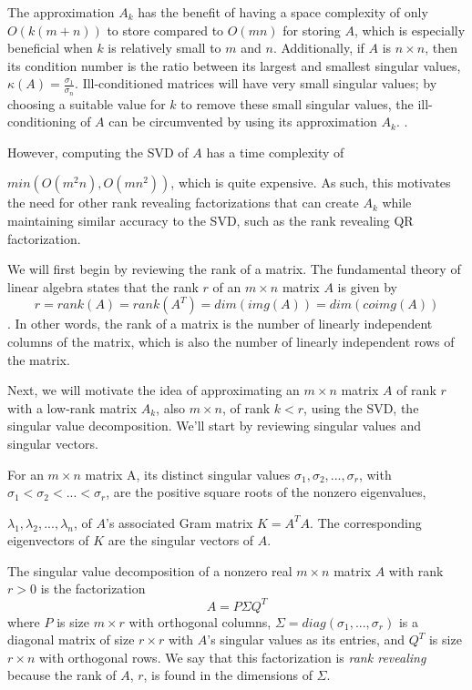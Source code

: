 The approximation $A_k$ has the benefit of having a space complexity of only $O(k(m + n))$ to store compared to $O(mn)$ for storing $A$, which is especially beneficial when $k$ is relatively small to $m$ and $n$. %
Additionally, if $A$ is $n \times n$, then its condition number is the ratio between its largest and smallest singular values, $\kappa(A) = \frac{\sigma_1}{\sigma_n}$. \cite{appliedLinearAlgebra} Ill-conditioned matrices will have very small singular values; by choosing a suitable value for $k$ to remove these small singular values, the ill-conditioning of $A$ can be circumvented by using its approximation $A_k$. \cite{appliedLinearAlgebra}.

However, computing the SVD of $A$ has a time complexity of

\noindent $min(O(m^{2}n), O(mn^{2}))$, which is quite expensive. %
As such, this motivates the need for other rank revealing factorizations that can create $A_k$ while maintaining similar accuracy to the SVD, such as the rank revealing QR factorization.




We will first begin by reviewing the rank of a matrix. The fundamental theory of linear algebra states that the rank $r$ of an $m \times n$ matrix $A$ is given by
\[ r = rank(A) = rank(A^T) = dim(img(A)) = dim(coimg(A)) \].  
\noindent In other words, the rank of a matrix is the number of linearly independent columns of the matrix, which is also the number of linearly independent rows of the matrix.\cite{appliedLinearAlgebra}

Next, we will motivate the idea of approximating an $m \times n$ matrix $A$ of rank $r$ with a low-rank matrix $A_k$, also $m \times n$, of rank $k < r$, using the SVD, the singular value decomposition. We'll start by reviewing singular values and singular vectors. 

For an $m \times n$ matrix A, its distinct singular values ${\sigma_1, \sigma_2, ..., \sigma_r}$, with $\sigma_{1} < \sigma_{2} < ... < \sigma_{r}$, are the positive square roots of the nonzero eigenvalues,

\noindent ${\lambda_1, \lambda_2, ..., \lambda_n}$, of $A$'s associated Gram matrix $K = A^{T}A$. The corresponding eigenvectors of $K$ are the singular vectors of $A$. \cite{appliedLinearAlgebra}

The singular value decomposition of a nonzero real $m \times n$ matrix $A$ with rank $r > 0$ is the factorization
\[A = P \Sigma Q^{T}\]
where $P$ is size $m \times r$ with orthogonal columns, $\Sigma = diag(\sigma_1, ..., \sigma_r)$ is a diagonal matrix of size $r \times r$ with $A$'s singular values as its entries, and $Q^{T}$ is size $r \times n$ with orthogonal rows.\cite{appliedLinearAlgebra} We say that this factorization is \textit{rank revealing} because the rank of $A$, $r$, is found in the dimensions of $\Sigma$.

